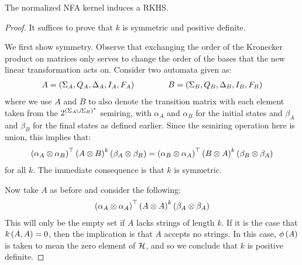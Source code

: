 \documentclass[12pt]{article}
\begin{document}
\begin{theorem}
  The normalized NFA kernel induces a RKHS.
\end{theorem}
\begin{proof}
  It suffices to prove that \(k\) is symmetric and
  positive definite.

  We first show symmetry.
  Observe that exchanging the order of the Kronecker product
  on matrices only serves to change the order of the bases that the
  new linear transformation acts on.
  Consider two automata given as:
  \begin{align}
    A = \left(\Sigma_A, Q_A, \Delta_A, I_A, F_A\right)
    \qquad \qquad
    B = \left(\Sigma_B, Q_B, \Delta_B, I_B, F_B\right)
  \end{align}
  where we use \(A\) and \(B\) to also denote the transition matrix
  with each element taken from the
  \(2^{\left(\Sigma_A \cup \Sigma_B\right)^\star}\) semiring,
  with \(\alpha_A\) and \(\alpha_B\) for the initial states
  and \(\beta_A\) and \(\beta_B\) for the final states as defined earlier.
  Since the semiring operation here is union, this implies that:
  \begin{align}
    \left(\alpha_A \otimes \alpha_B\right)^\top
    \left(A \otimes B\right)^k
    \left(\beta_A \otimes \beta_B\right)
    =
    \left(\alpha_B \otimes \alpha_A\right)^\top
    \left(B \otimes A\right)^k
    \left(\beta_B \otimes \beta_A\right)
  \end{align}
  for all \(k\).
  The immediate consequence is that \(k\) is symmetric.

  Now take \(A\) as before and consider the following:
  \begin{align}
    \left(\alpha_A \otimes \alpha_A\right)^\top
    \left(A \otimes A\right)^k
    \left(\beta_A \otimes \beta_A\right)
  \end{align}
  This will only be the empty set if \(A\)
  lacks strings of length \(k\).
  If it is the case that \(k\left(A, A\right) = 0\),
  then the implication is that \(A\) accepts no strings.
  In this case, \(\phi\left(A\right)\) is taken to mean the zero element of
  \(\mathcal{H}\),
  and so we conclude that \(k\) is positive definite.

\end{proof}
\end{document}

